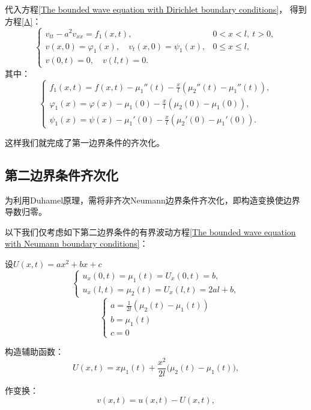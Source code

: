 \documentclass[12pt,a4paper]{article}
\numberwithin{subsection}{section}
\numberwithin{subsubsection}{subsection}
\theoremstyle{plain}
\theoremstyle{definition}
\theoremstyle{remark}
\begin{document}
	 代入方程\eqref{The bounded wave equation with Dirichlet boundary conditions}，
	得到方程\eqref{A}：
	\begin{equation}\label{A}
	\begin{cases}
		v_{tt} - a^2 v_{xx} = f_1(x, t), & 0 < x < l, \ t > 0, \\
		v(x, 0) = \varphi_1(x), \quad v_t(x, 0) = \psi_1(x), & 0 \leq x \leq l, \\
		v(0, t) = 0, \quad v(l, t) = 0. &
	\end{cases}
\end{equation}
	其中：
	\begin{equation}
		\begin{cases}
			f_1(x, t) = f(x, t) - \mu_1''(t) - \frac{x}{l}(\mu_2''(t) - \mu_1''(t)), \\
			\varphi_1(x) = \varphi(x) - \mu_1(0) - \frac{x}{l}(\mu_2(0) - \mu_1(0)), \\
			\psi_1(x) = \psi(x) - \mu_1'(0) - \frac{x}{l}(\mu_2'(0) - \mu_1'(0)).
		\end{cases}
	\end{equation}
	
	这样我们就完成了第一边界条件的齐次化。
	
	\subsection{第二边界条件齐次化}
	为利用Duhamel原理，需将非齐次Neumann边界条件齐次化，即构造变换使边界导数归零。

		
		以下我们仅考虑如下第二边界条件的有界波动方程\eqref{The bounded wave equation with Neumann boundary conditions}：
		
		设$U(x, t)=ax^2+bx+c$
		\[
		\begin{cases}
			u_x(0, t) = \mu_1(t) = U_x(0, t) = b, \\
			u_x(l, t) = \mu_2(t) = U_x(l, t) = 2al + b,
		\end{cases}
		\]
		\[
		\begin{cases}
			a = \frac{1}{2l}(\mu_2(t) - \mu_1(t)) \\
			b = \mu_1(t) \\
			c = 0 
		\end{cases}
		\]
		
		构造辅助函数：
		\begin{equation}
			U(x, t) = x\mu_1(t) + \frac{x^2}{2l}\big( \mu_2(t) - \mu_1(t) \big),
		\end{equation}
		
		作变换：
		\begin{equation}
			v(x, t) = u(x, t) - U(x, t),
		\end{equation}
		
\end{document}
